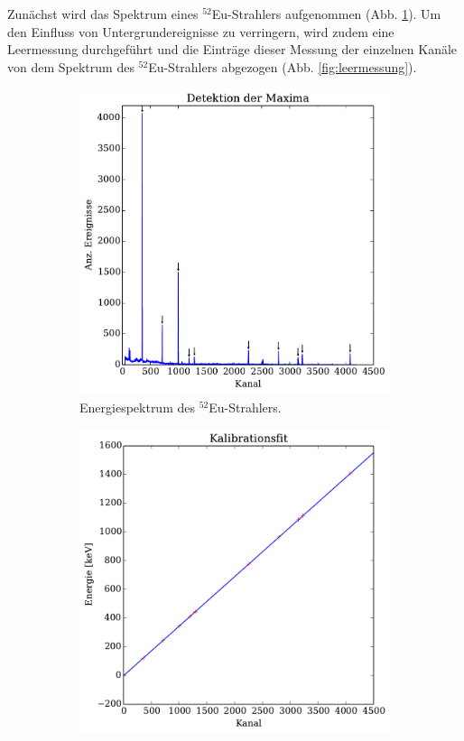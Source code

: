 Zunächst wird das Spektrum eines $^{52}$Eu-Strahlers aufgenommen (Abb. \ref{fig:eu_uncalibrated}).
Um den Einfluss von Untergrundereignisse zu verringern, wird zudem eine Leermessung durchgeführt und die Einträge dieser Messung der einzelnen Kanäle von dem Spektrum des $^{52}$Eu-Strahlers abgezogen (Abb. \ref{fig:leermessung}).
\begin{figure}[htb]
    \centering
    \begin{subfigure}{.49\linewidth}
        \includegraphics[width=1.0\linewidth]{img/02_maxima.pdf}
        \caption{
            Energiespektrum des $^{52}$Eu-Strahlers.
        }
        \label{fig:eu_uncalibrated}
    \end{subfigure}%
    \begin{subfigure}{.49\linewidth}
        \includegraphics[width=1.0\linewidth]{img/03_calibration.pdf}

\end{subfigure}
\end{figure}
